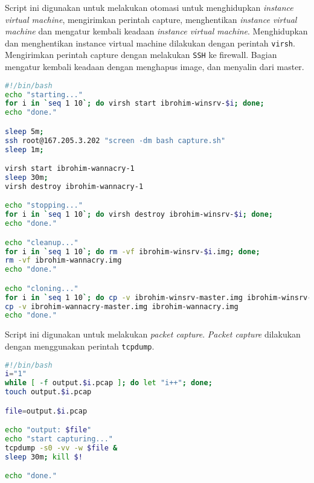 

Script ini digunakan untuk melakukan otomasi untuk menghidupkan \textit{instance virtual machine}, mengirimkan perintah capture, menghentikan \textit{instance virtual machine} dan mengatur kembali keadaan \textit{instance virtual machine}. Menghidupkan dan menghentikan instance virtual machine dilakukan dengan perintah \verb|virsh|. Mengirimkan perintah capture dengan melakukan \verb|SSH| ke firewall. Bagian mengatur kembali keadaan dengan menghapus image, dan menyalin dari master.

\begin{lstlisting}[language=Bash]
#!/bin/bash
echo "starting..."
for i in `seq 1 10`; do virsh start ibrohim-winsrv-$i; done;
echo "done."

sleep 5m;
ssh root@167.205.3.202 "screen -dm bash capture.sh"
sleep 1m;

virsh start ibrohim-wannacry-1
sleep 30m;
virsh destroy ibrohim-wannacry-1

echo "stopping..."
for i in `seq 1 10`; do virsh destroy ibrohim-winsrv-$i; done;
echo "done."

echo "cleanup..."
for i in `seq 1 10`; do rm -vf ibrohim-winsrv-$i.img; done;
rm -vf ibrohim-wannacry.img
echo "done."

echo "cloning..."
for i in `seq 1 10`; do cp -v ibrohim-winsrv-master.img ibrohim-winsrv-$i.img; done;
cp -v ibrohim-wannacry-master.img ibrohim-wannacry.img
echo "done."
\end{lstlisting}


Script ini digunakan untuk melakukan \textit{packet capture}. \textit{Packet capture} dilakukan dengan menggunakan perintah \verb|tcpdump|.

\begin{lstlisting}[language=Bash]
#!/bin/bash
i="1"
while [ -f output.$i.pcap ]; do let "i++"; done;
touch output.$i.pcap

file=output.$i.pcap

echo "output: $file"
echo "start capturing..."
tcpdump -s0 -vv -w $file &
sleep 30m; kill $!

echo "done."
\end{lstlisting}

